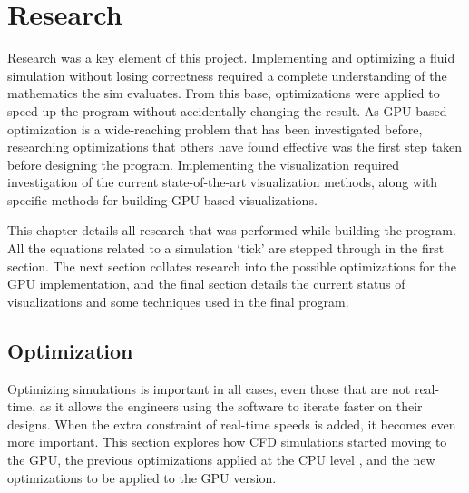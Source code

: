
\chapter{Research}
\label{sec:Research} 

Research was a key element of this project.
Implementing and optimizing a fluid simulation without losing correctness required a complete understanding of the mathematics the sim evaluates.
From this base, optimizations were applied to speed up the program without accidentally changing the result.
As GPU-based optimization is a wide-reaching problem that has been investigated before, researching optimizations that others have found effective was the first step taken before designing the program.
Implementing the visualization required investigation of the current state-of-the-art visualization methods, along with specific methods for building GPU-based visualizations.

This chapter details all research that was performed while building the program.
All the equations related to a simulation `tick' are stepped through in the first section.
The next section collates research into the possible optimizations for the GPU implementation, and the final section details the current status of visualizations and some techniques used in the final program.

\pagebreak


\pagebreak
\section{Optimization}
\label{sec:Research:Optimization}
Optimizing simulations is important in all cases, even those that are not real-time, as it allows the engineers using the software to iterate faster on their designs.
When the extra constraint of real-time speeds is added, it becomes even more important.
This section explores how CFD simulations started moving to the GPU, the previous optimizations applied at the CPU level
, and the new optimizations to be applied to the GPU version.


